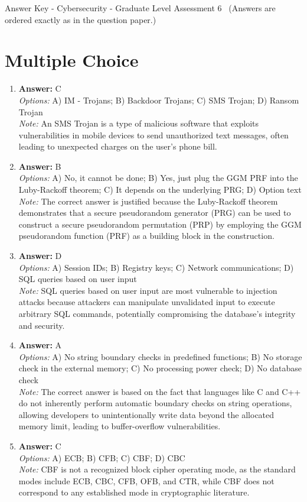 \documentclass[12pt]{article}
\begin{document}
\begin{center}
Answer Key - Cybersecurity - Graduate Level Assessment 6 \
\small (Answers are ordered exactly as in the question paper.)
\end{center}

\section*{Multiple Choice}
\begin{enumerate}[label=\arabic*.]
\item \textbf{Answer:} C
\\ \textit{Options:} A) IM - Trojans; B) Backdoor Trojans; C) SMS Trojan; D) Ransom Trojan
\\ \textit{Note:} An SMS Trojan is a type of malicious software that exploits vulnerabilities in mobile devices to send unauthorized text messages, often leading to unexpected charges on the user's phone bill.
\item \textbf{Answer:} B
\\ \textit{Options:} A) No, it cannot be done; B) Yes, just plug the GGM PRF into the Luby-Rackoff theorem; C) It depends on the underlying PRG; D) Option text
\\ \textit{Note:} The correct answer is justified because the Luby-Rackoff theorem demonstrates that a secure pseudorandom generator (PRG) can be used to construct a secure pseudorandom permutation (PRP) by employing the GGM pseudorandom function (PRF) as a building block in the construction.
\item \textbf{Answer:} D
\\ \textit{Options:} A) Session IDs; B) Registry keys; C) Network communications; D) SQL queries based on user input
\\ \textit{Note:} SQL queries based on user input are most vulnerable to injection attacks because attackers can manipulate unvalidated input to execute arbitrary SQL commands, potentially compromising the database's integrity and security.
\item \textbf{Answer:} A
\\ \textit{Options:} A) No string boundary checks in predefined functions; B) No storage check in the external memory; C) No processing power check; D) No database check
\\ \textit{Note:} The correct answer is based on the fact that languages like C and C++ do not inherently perform automatic boundary checks on string operations, allowing developers to unintentionally write data beyond the allocated memory limit, leading to buffer-overflow vulnerabilities.
\item \textbf{Answer:} C
\\ \textit{Options:} A) ECB; B) CFB; C) CBF; D) CBC
\\ \textit{Note:} CBF is not a recognized block cipher operating mode, as the standard modes include ECB, CBC, CFB, OFB, and CTR, while CBF does not correspond to any established mode in cryptographic literature.
\end{enumerate}
\end{document}
